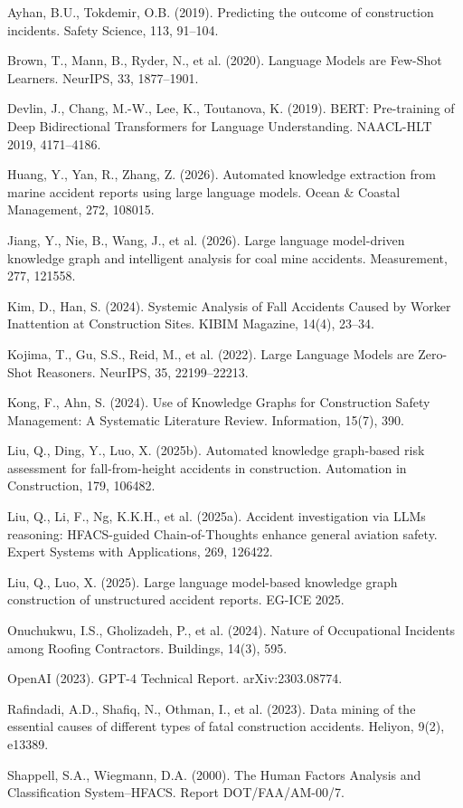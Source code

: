 \documentclass[11pt]{article}
\begin{document}
Ayhan, B.U., Tokdemir, O.B. (2019). Predicting the outcome of construction incidents. Safety Science, 113, 91--104.

Brown, T., Mann, B., Ryder, N., et al. (2020). Language Models are Few-Shot Learners. NeurIPS, 33, 1877--1901.

Devlin, J., Chang, M.-W., Lee, K., Toutanova, K. (2019). BERT: Pre-training of Deep Bidirectional Transformers for Language Understanding. NAACL-HLT 2019, 4171--4186.

Huang, Y., Yan, R., Zhang, Z. (2026). Automated knowledge extraction from marine accident reports using large language models. Ocean \& Coastal Management, 272, 108015.

Jiang, Y., Nie, B., Wang, J., et al. (2026). Large language model-driven knowledge graph and intelligent analysis for coal mine accidents. Measurement, 277, 121558.

Kim, D., Han, S. (2024). Systemic Analysis of Fall Accidents Caused by Worker Inattention at Construction Sites. KIBIM Magazine, 14(4), 23--34.

Kojima, T., Gu, S.S., Reid, M., et al. (2022). Large Language Models are Zero-Shot Reasoners. NeurIPS, 35, 22199--22213.

Kong, F., Ahn, S. (2024). Use of Knowledge Graphs for Construction Safety Management: A Systematic Literature Review. Information, 15(7), 390.

Liu, Q., Ding, Y., Luo, X. (2025b). Automated knowledge graph-based risk assessment for fall-from-height accidents in construction. Automation in Construction, 179, 106482.

Liu, Q., Li, F., Ng, K.K.H., et al. (2025a). Accident investigation via LLMs reasoning: HFACS-guided Chain-of-Thoughts enhance general aviation safety. Expert Systems with Applications, 269, 126422.

Liu, Q., Luo, X. (2025). Large language model-based knowledge graph construction of unstructured accident reports. EG-ICE 2025.

Onuchukwu, I.S., Gholizadeh, P., et al. (2024). Nature of Occupational Incidents among Roofing Contractors. Buildings, 14(3), 595.

OpenAI (2023). GPT-4 Technical Report. arXiv:2303.08774.

Rafindadi, A.D., Shafiq, N., Othman, I., et al. (2023). Data mining of the essential causes of different types of fatal construction accidents. Heliyon, 9(2), e13389.

Shappell, S.A., Wiegmann, D.A. (2000). The Human Factors Analysis and Classification System--HFACS. Report DOT/FAA/AM-00/7.
\end{document}
